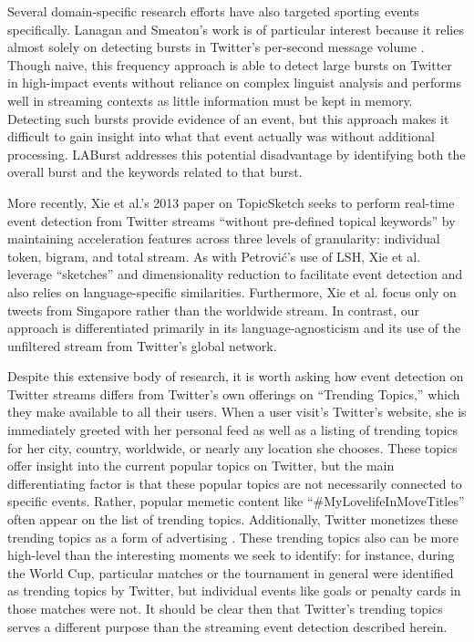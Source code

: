 \documentclass[letterpaper]{article}
\begin{document}
Several domain-specific research efforts have also targeted sporting events specifically\cite{vasudevan2013twitter,Zhao2011,lanagan2011using}.
Lanagan and Smeaton's work is of particular interest because it relies almost solely on detecting bursts in Twitter's per-second message volume \cite{lanagan2011using}.
Though naive, this frequency approach is able to detect large bursts on Twitter in high-impact events  without reliance on complex linguist analysis and performs well in streaming contexts as little information must be kept in memory.
Detecting such bursts provide evidence of an event, but this approach makes it difficult to gain insight into what that event actually was without additional processing.
LABurst addresses this potential disadvantage by identifying both the overall burst and the keywords related to that burst.

More recently, Xie et al.'s 2013 paper on TopicSketch seeks to perform real-time event detection from Twitter streams ``without pre-defined topical keywords'' by maintaining acceleration features across three levels of granularity: individual token, bigram, and total stream.
As with Petrovi\'{c}'s use of LSH, Xie et al. leverage ``sketches'' and dimensionality reduction to facilitate event detection and also relies on language-specific similarities.
Furthermore, Xie et al. focus only on tweets from Singapore rather than the worldwide stream.
In contrast, our approach is differentiated primarily in its language-agnosticism and its use of the unfiltered stream from Twitter's global network.

Despite this extensive body of research, it is worth asking how event detection on Twitter streams differs from Twitter's own offerings on ``Trending Topics,'' which they make available to all their users.
When a user visit's Twitter's website, she is immediately greeted with her personal feed as well as a listing of trending topics for her city, country, worldwide, or nearly any location she chooses.
These topics offer insight into the current popular topics on Twitter, but the main differentiating factor is that these popular topics are not necessarily connected to specific events.
Rather, popular memetic content like ``\#MyLovelifeInMoveTitles'' often appear on the list of trending topics.
Additionally, Twitter monetizes these trending topics as a form of advertising \cite{Sydell2011}.  
These trending topics also can be more high-level than the interesting moments we seek to identify: for instance, during the World Cup, particular matches or the tournament in general were identified as trending topics by Twitter, but individual events like goals or penalty cards in those matches were not.
It should be clear then that Twitter's trending topics serves a different purpose than the streaming event detection described herein.
\end{document}
